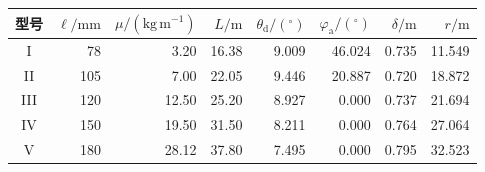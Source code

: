 \begin{tabular}{crrrrrrr}
\toprule
型号 & $\ell/\mathrm{mm}$ & $\mu/(\mathrm{kg\,m^{-1}})$ & $L/\mathrm m$ & $\theta_{\mathrm d}/(^\circ)$ & $\varphi_{\mathrm a}/(^\circ)$ & $\delta/\mathrm m$ & $r/\mathrm m$ \\
\midrule
I & 78 & 3.20 & 16.38 & 9.009 & 46.024 & 0.735 & 11.549 \\
II & 105 & 7.00 & 22.05 & 9.446 & 20.887 & 0.720 & 18.872 \\
III & 120 & 12.50 & 25.20 & 8.927 & 0.000 & 0.737 & 21.694 \\
IV & 150 & 19.50 & 31.50 & 8.211 & 0.000 & 0.764 & 27.064 \\
V & 180 & 28.12 & 37.80 & 7.495 & 0.000 & 0.795 & 32.523 \\
\bottomrule
\end{tabular}
